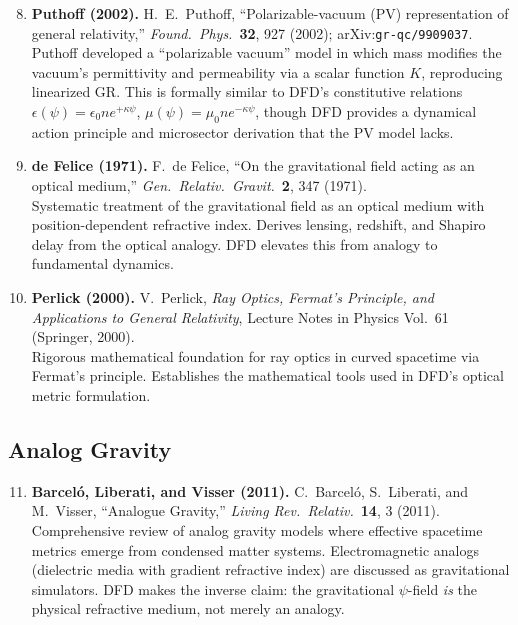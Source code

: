 \documentclass[11pt]{article}
\theoremstyle{plain}
\theoremstyle{definition}
\theoremstyle{remark}
\begin{document}
\begin{enumerate}
\setcounter{enumi}{7}

\item \textbf{Puthoff (2002).}
H.~E.~Puthoff, ``Polarizable-vacuum (PV) representation of general
relativity,'' \textit{Found.\ Phys.}\ \textbf{32}, 927 (2002);
arXiv:\texttt{gr-qc/9909037}.\\
Puthoff developed a ``polarizable vacuum'' model in which mass modifies
the vacuum's permittivity and permeability via a scalar function $K$,
reproducing linearized GR. This is formally similar to DFD's constitutive
relations $\epsilon(\psi) = \epsilon_0 n e^{+\kappa\psi}$,
$\mu(\psi) = \mu_0 n e^{-\kappa\psi}$, though DFD provides a dynamical
action principle and microsector derivation that the PV model lacks.

\item \textbf{de Felice (1971).}
F.~de Felice, ``On the gravitational field acting as an optical medium,''
\textit{Gen.\ Relativ.\ Gravit.}\ \textbf{2}, 347 (1971).\\
Systematic treatment of the gravitational field as an optical medium
with position-dependent refractive index. Derives lensing, redshift,
and Shapiro delay from the optical analogy. DFD elevates this from
analogy to fundamental dynamics.

\item \textbf{Perlick (2000).}
V.~Perlick, \textit{Ray Optics, Fermat's Principle, and Applications
to General Relativity}, Lecture Notes in Physics Vol.~61
(Springer, 2000).\\
Rigorous mathematical foundation for ray optics in curved spacetime
via Fermat's principle. Establishes the mathematical tools used in
DFD's optical metric formulation.

\end{enumerate}

\subsection{Analog Gravity}

\begin{enumerate}
\setcounter{enumi}{10}

\item \textbf{Barcel\'{o}, Liberati, and Visser (2011).}
C.~Barcel\'{o}, S.~Liberati, and M.~Visser, ``Analogue Gravity,''
\textit{Living Rev.\ Relativ.}\ \textbf{14}, 3 (2011).\\
Comprehensive review of analog gravity models where effective
spacetime metrics emerge from condensed matter systems.
Electromagnetic analogs (dielectric media with gradient refractive
index) are discussed as gravitational simulators. DFD makes the
inverse claim: the gravitational $\psi$-field \emph{is} the physical
refractive medium, not merely an analogy.

\end{enumerate}
\end{document}
